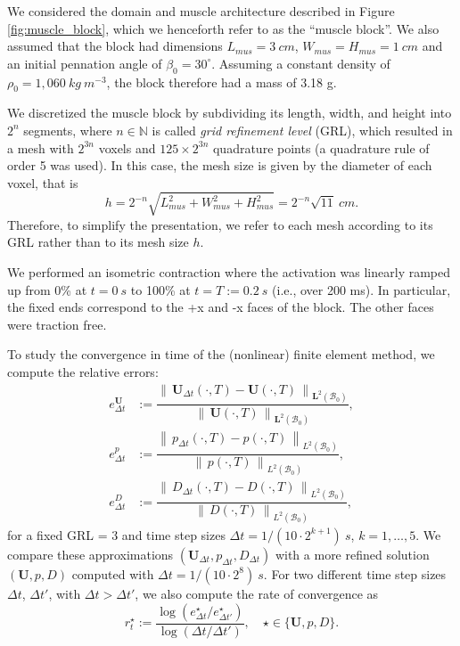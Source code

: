 \documentclass{sfuthesis}
\numberwithin{equation}{section}
\numberwithin{figure}{chapter}
\numberwithin{table}{chapter}
\theoremstyle{definition}
\def\*#1{{\mathbf{#1}}} %
\newcommand{\B}{\mathcal{B}}
\newcommand{\norm}[1]{{\left\| \, #1 \, \right\|}}
\begin{document}
We considered the domain and muscle architecture described in Figure \ref{fig:muscle_block}, which we henceforth refer to as the ``muscle block''. We also assumed that the block had dimensions $L_{mus} = 3 \ \unit{cm}$, $W_{mus} = H_{mus} = 1 \ \unit{cm}$ and an initial pennation angle of $\beta_0 = 30^\circ$. Assuming a constant density of $\rho_0 = 1,060 \ \unit{kg \ m^{-3}}$, the block therefore had a mass of 3.18 \unit{g}. 

We discretized the muscle block by subdividing its length, width, and height into $2^n$ segments, where $n \in \mathbb{N}$ is called \textit{grid refinement level} (GRL), which resulted in a mesh with $2^{3n}$ voxels and $125 \times 2^{3n}$ quadrature points (a quadrature rule of order 5 was used). In this case, the mesh size is given by the diameter of each voxel, that is
\[
    h = 2^{-n} \sqrt{L_{mus}^2 + W_{mus}^2 + H_{mus}^2} = 2^{-n} \sqrt{11} \ \unit{cm}.
\]
Therefore, to simplify the presentation, we refer to each mesh according to its GRL rather than to its mesh size $h$.

We performed an isometric contraction where the activation was linearly ramped up from 0\% at $t=0 \ \unit{s}$ to 100\% at $t = T := 0.2 \ \unit{s}$ (i.e., over 200 ms). In particular, the fixed ends correspond to the +x and -x faces of the block. The other faces were traction free.

To study the convergence in time of the (nonlinear) finite element method, we compute the relative errors:
\begin{subequations}
    \begin{eqnarray}
        e^{\*U}_{\Delta t} &:= \dfrac{\norm{\*U_{\Delta t}(\cdot,T) - \*U(\cdot,T)}_{\*L^2(\B_0)}}{\norm{\*U(\cdot,T)}_{\*L^2(\B_0)}}, \\
        e^p_{\Delta t} &:= \dfrac{\norm{p_{\Delta t}(\cdot,T) - p(\cdot,T)}_{L^2(\B_0)}}{\norm{p(\cdot,T)}_{L^2(\B_0)}}, \\
        e^D_{\Delta t} &:= \dfrac{\norm{D_{\Delta t}(\cdot,T) - D(\cdot,T)}_{L^2(\B_0)}}{\norm{D(\cdot,T)}_{L^2(\B_0)}},
    \end{eqnarray}
\end{subequations}
for a fixed GRL = 3 and time step sizes $\Delta t = 1/(10 \cdot 2^{k+1}) \ \unit{s}$, $k = 1, \dots, 5$. We compare these approximations $(\*U_{\Delta t}, p_{\Delta t}, D_{\Delta t})$ with a more refined solution $(\*U, p, D)$ computed with $\Delta t = 1/(10 \cdot 2^8) \ \unit{s}$. For two different time step sizes $\Delta t$, $\Delta t'$, with $\Delta t > \Delta t'$, we also compute the rate of convergence as
\begin{equation}
    r^{\star}_t := \dfrac{\log \left(e^\star_{\Delta t} / e^\star_{\Delta t'} \right)}{\log \left(\Delta t / \Delta t'  \right)}, \quad \star \in \{ \*U, p, D \}.
\end{equation}
\end{document}
